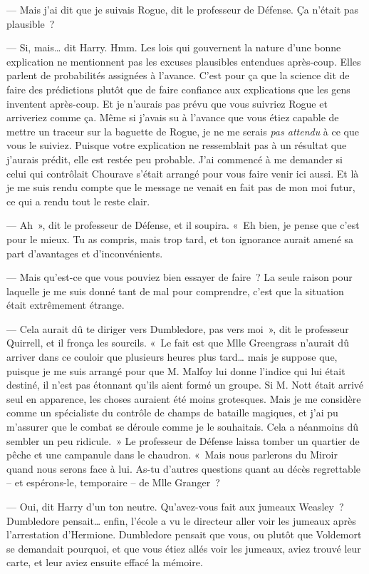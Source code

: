 --- Mais j'ai dit que je suivais Rogue, dit le professeur de Défense. Ça n'était pas plausible~?

--- Si, mais… dit Harry. Hmm. Les lois qui gouvernent la nature d'une bonne explication ne mentionnent pas les excuses plausibles entendues après-coup. Elles parlent de probabilités assignées à l'avance. C'est pour ça que la science dit de faire des prédictions plutôt que de faire confiance aux explications que les gens inventent après-coup. Et je n'aurais pas prévu que vous suivriez Rogue et arriveriez comme ça. Même si j'avais su à l'avance que vous étiez capable de mettre un traceur sur la baguette de Rogue, je ne me serais \emph{pas attendu} à ce que vous le suiviez. Puisque votre explication ne ressemblait pas à un résultat que j'aurais prédit, elle est restée peu probable. J'ai commencé à me demander si celui qui contrôlait Chourave s'était arrangé pour vous faire venir ici aussi. Et là je me suis rendu compte que le message ne venait en fait pas de mon moi futur, ce qui a rendu tout le reste clair.

--- Ah~», dit le professeur de Défense, et il soupira. «~Eh bien, je pense que c'est pour le mieux. Tu as compris, mais trop tard, et ton ignorance aurait amené sa part d'avantages et d'inconvénients.

--- Mais qu'est-ce que vous pouviez bien essayer de faire~? La seule raison pour laquelle je me suis donné tant de mal pour comprendre, c'est que la situation était extrêmement étrange.

--- Cela aurait dû te diriger vers Dumbledore, pas vers moi~», dit le professeur Quirrell, et il fronça les sourcils. «~Le fait est que Mlle Greengrass n'aurait dû arriver dans ce couloir que plusieurs heures plus tard… mais je suppose que, puisque je me suis arrangé pour que M. Malfoy lui donne l'indice qui lui était destiné, il n'est pas étonnant qu'ils aient formé un groupe. Si M. Nott était arrivé seul en apparence, les choses auraient été moins grotesques. Mais je me considère comme un spécialiste du contrôle de champs de bataille magiques, et j'ai pu m'assurer que le combat se déroule comme je le souhaitais. Cela a néanmoins dû sembler un peu ridicule.~» Le professeur de Défense laissa tomber un quartier de pêche et une campanule dans le chaudron. «~Mais nous parlerons du Miroir quand nous serons face à lui. As-tu d'autres questions quant au décès regrettable -- et espérons-le, temporaire -- de Mlle Granger~?

--- Oui, dit Harry d'un ton neutre. Qu'avez-vous fait aux jumeaux Weasley~? Dumbledore pensait… enfin, l'école a vu le directeur aller voir les jumeaux après l'arrestation d'Hermione. Dumbledore pensait que vous, ou plutôt que Voldemort se demandait pourquoi, et que vous étiez allés voir les jumeaux, aviez trouvé leur carte, et leur aviez ensuite effacé la mémoire.

